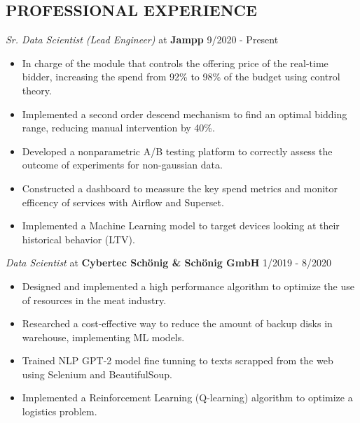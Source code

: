 \documentclass[margin]{res}
\begin{document}
\begin{resume}
    \section{PROFESSIONAL EXPERIENCE} 
    {\sl Sr. Data Scientist (Lead Engineer)} at {\bf Jampp} \hfill 9/2020 - Present
    \begin{itemize}  \itemsep -2pt %
        \item In charge of the module that controls the offering price of the
            real-time bidder, increasing the spend from 92\% to 98\%
            of the budget using control theory.
        \item Implemented a second order descend mechanism to find an optimal bidding range,
            reducing manual intervention by 40\%.
        \item Developed a nonparametric A/B testing platform to correctly assess the
            outcome of experiments for non-gaussian data. 
        \item Constructed a dashboard to meassure the key spend metrics and monitor
            efficency of services with Airflow and Superset.
        \item Implemented a Machine Learning model to target devices looking at their
            historical behavior (LTV).
    \end{itemize} 
    {\sl Data Scientist} at {\bf Cybertec Sch\"onig \& Sch\"onig GmbH} \hfill 1/2019 - 8/2020
    \begin{itemize}  \itemsep -2pt %
        \item Designed and implemented a high performance 
            algorithm to optimize the use of resources in the meat industry.
        \item Researched a cost-effective way to reduce the amount of 
		     backup disks in warehouse, implementing ML models. 
        \item Trained NLP GPT-2 model fine tunning to texts scrapped from the web using
            Selenium and BeautifulSoup.
        \item Implemented a Reinforcement Learning (Q-learning) algorithm 
            to optimize a logistics problem.
    \end{itemize}
		

\end{resume}
\end{document}
